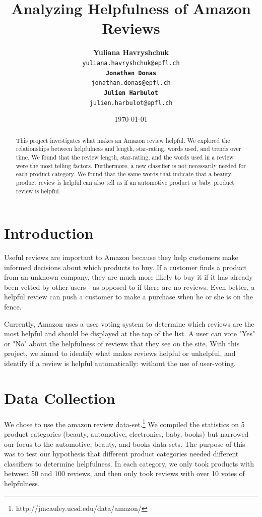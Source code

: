 \documentclass[11pt]{article}
\title{Analyzing Helpfulness of Amazon Reviews}
\date{\today}
\author{
  \textbf{Yuliana Havryshchuk} \\
    \tt{yuliana.havryshchuk@epfl.ch} \\
  \textbf{Jonathan Donas} \\
    \tt{jonathan.donas@epfl.ch} \\
  \textbf{Julien Harbulot} \\
    \tt{julien.harbulot@epfl.ch}}
\begin{document}
\maketitle
\begin{abstract}

This project investigates what makes an Amazon review helpful. We explored the relationships between helpfulness and length, star-rating, words used, and trends over time. We found that the review length, star-rating, and the words used in a review were the most telling factors. Furthermore, a new classifier is not necessarily needed for each product category. We found that the same words that indicate that a beauty product review is helpful can also tell us if an automotive product or baby product review is helpful.

\end{abstract}

\vspace{0em}
\section{Introduction}

Useful reviews are important to Amazon because they help customers make informed decisions about which products to buy. If a customer finds a product from an unknown company, they are much more likely to buy it if it has already been vetted by other users - as opposed to if there are no reviews. Even better, a helpful review can push a customer to make a purchase when he or she is on the fence.

Currently, Amazon uses a user voting system to determine which reviews are the most helpful and should be displayed at the top of the list. A user can vote "Yes" or "No" about the helpfulness of reviews that they see on the site. With this project, we aimed to identify what makes reviews helpful or unhelpful, and identify if a review is helpful automatically: without the use of user-voting.

\vspace{0.5em}
\section{Data Collection}

We chose to use the amazon review data-set.\footnote{http://jmcauley.ucsd.edu/data/amazon/} We compiled the statistics on 5 product categories (beauty, automotive, electronics, baby, books) but narrowed our focus to the automotive, beauty, and books data-sets. The purpose of this was to test our hypothesis that different product categories needed different classifiers to determine helpfulness. In each category, we only took products with between 50 and 100 reviews, and then only took reviews with over 10 votes of helpfulness. 
\end{document}

